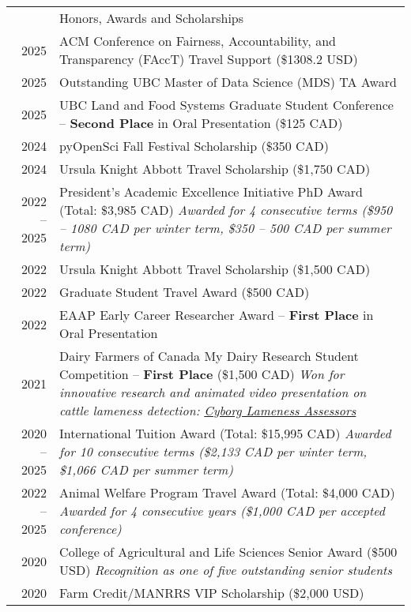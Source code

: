 \documentclass[letterpaper, 11pt]{article}
\newcommand{\headingfont}{\Large\color{OliveGreen}}
\newenvironment{SectionTableSingleSpace}[1]{
	\renewcommand*{\arraystretch}{1.2}
	\setlength{\tabcolsep}{10pt}
	\begin{longtable}{Rp{5.2in}} & #1 \\[0.6em]}
{\end{longtable}\vspace{-.3cm}}
\begin{document}
\begin{SectionTableSingleSpace}{\headingfont Honors, Awards and Scholarships}
2025 &
ACM Conference on Fairness, Accountability, and Transparency (FAccT) Travel Support (\$1308.2 USD) \\
2025 &
Outstanding UBC Master of Data Science (MDS) TA Award \\
2025 &
UBC Land and Food Systems Graduate Student Conference -- \textbf{Second Place} in Oral Presentation (\$125 CAD) \\
2024 & 
pyOpenSci Fall Festival Scholarship (\$350 CAD)  \\
2024 & 
Ursula Knight Abbott Travel Scholarship (\$1,750 CAD) \\
2022 -- 2025 & 
President's Academic Excellence Initiative PhD Award (Total: \$3,985 CAD) \newline
\textit{Awarded for 4 consecutive terms (\$950 -- 1080 CAD per winter term, \$350 -- 500 CAD per summer term)} \\
2022 & 
Ursula Knight Abbott Travel Scholarship (\$1,500 CAD) \\
2022 & 
Graduate Student Travel Award (\$500 CAD) \\
2022 & 
EAAP Early Career Researcher Award -- \textbf{First Place} in Oral Presentation \\
2021 & 
Dairy Farmers of Canada My Dairy Research Student Competition -- \textbf{First Place} (\$1,500 CAD) \newline
\textit{Won for innovative research and animated video presentation on cattle lameness detection: \href{https://youtu.be/HDe4uR7Tz9M?si=zMK2LjNmSAS5C4Mj}{Cyborg Lameness Assessors}} \\
2020 -- 2025 & 
International Tuition Award (Total: \$15,995 CAD) \newline
\textit{Awarded for 10 consecutive terms (\$2,133 CAD per winter term, \$1,066 CAD per summer term)} \\
2022 -- 2025 & 
Animal Welfare Program Travel Award (Total: \$4,000 CAD) \newline
\textit{Awarded for 4 consecutive years (\$1,000 CAD per accepted conference)} \\
2020 & 
College of Agricultural and Life Sciences Senior Award (\$500 USD) \newline
\textit{Recognition as one of five outstanding senior students} \\
2020 & 
Farm Credit/MANRRS VIP Scholarship (\$2,000 USD) \newline

\end{SectionTableSingleSpace}
\end{document}
